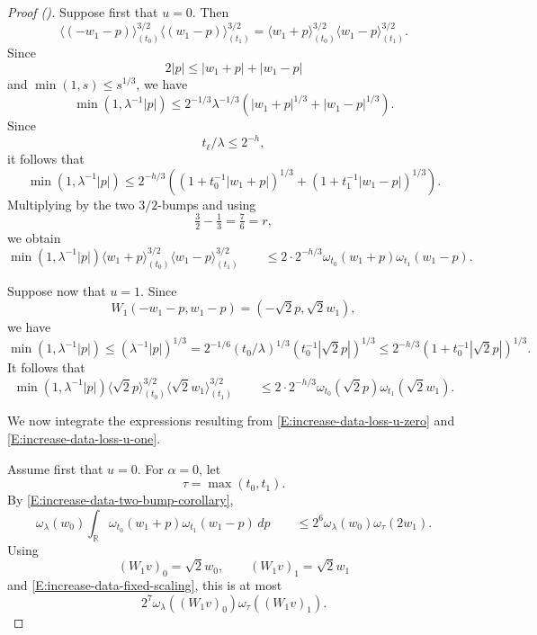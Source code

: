 \documentclass[12pt,reqno]{amsart}
\newcommand{\auto}{{({\tiny\faCar})}}
\theoremstyle{plain}
\numberwithin{equation}{section}
\theoremstyle{remark}
\begin{document}
\begin{proof}[Proof \auto]
Suppose first that \(u=0\). Then
\[
\langle(-w_1-p)\rangle_{(t_0)}^{3/2}
\langle(w_1-p)\rangle_{(t_1)}^{3/2}
=
\langle w_1+p\rangle_{(t_0)}^{3/2}
\langle w_1-p\rangle_{(t_1)}^{3/2}.
\]
Since
\[
2|p|
\leq
|w_1+p|+|w_1-p|
\]
and \(\min(1,s)\leq s^{1/3}\), we have
\[
\min(1,\lambda^{-1}|p|)
\leq
2^{-1/3}\lambda^{-1/3}
\left(|w_1+p|^{1/3}+|w_1-p|^{1/3}\right).
\]
Since
\[
t_\ell/\lambda\leq2^{-h},
\]
it follows that
\[
\min(1,\lambda^{-1}|p|)
\leq
2^{-h/3}
\left((1+t_0^{-1}|w_1+p|)^{1/3}+(1+t_1^{-1}|w_1-p|)^{1/3}\right).
\]
Multiplying by the two \(3/2\)-bumps and using
\[
\tfrac32-\tfrac13=\tfrac76=r,
\]
we obtain
\begin{equation}
    \label{E:increase-data-loss-u-zero}
    \min(1,\lambda^{-1}|p|) \langle w_1+p\rangle_{(t_0)}^{3/2} \langle w_1-p\rangle_{(t_1)}^{3/2} \qquad\leq 2 \cdot 2^{-h/3} \omega_{t_0}(w_1+p) \omega_{t_1}(w_1-p).
\end{equation}

Suppose now that \(u=1\). Since
\[
W_1(-w_1-p,w_1-p)
=
(-\sqrt2p,\sqrt2w_1),
\]
we have
\[
\min(1,\lambda^{-1}|p|) \leq (\lambda^{-1}|p|)^{1/3} = 2^{-1/6} (t_0/\lambda)^{1/3} (t_0^{-1}|\sqrt2p|)^{1/3} \leq 2^{-h/3} (1+t_0^{-1}|\sqrt2p|)^{1/3}.
\]
It follows that
\begin{equation}
    \label{E:increase-data-loss-u-one}
    \min(1,\lambda^{-1}|p|) \langle\sqrt2p\rangle_{(t_0)}^{3/2} \langle\sqrt2w_1\rangle_{(t_1)}^{3/2} \qquad\leq 2\cdot 2^{-h/3} \omega_{t_0}(\sqrt2p) \omega_{t_1}(\sqrt2w_1).
\end{equation}

We now integrate the expressions resulting from
\eqref{E:increase-data-loss-u-zero} and
\eqref{E:increase-data-loss-u-one}.

Assume first that \(u=0\). For \(\alpha=0\), let
\[
\tau=\max(t_0,t_1).
\]
By \eqref{E:increase-data-two-bump-corollary},
\[
\omega_\lambda(w_0) \int_{\mathbb R} \omega_{t_0}(w_1+p) \omega_{t_1}(w_1-p)\,dp \qquad\leq 2^6 \omega_\lambda(w_0) \omega_\tau(2w_1).
\]
Using
\[
(W_1v)_0=\sqrt2w_0,
\qquad
(W_1v)_1=\sqrt2w_1
\]
and \eqref{E:increase-data-fixed-scaling}, this is at most
\begin{equation}
    \label{E:increase-data-u0-alpha0}
    2^7
    \omega_\lambda((W_1v)_0)
    \omega_\tau((W_1v)_1).
\end{equation}


\end{proof}
\end{document}
